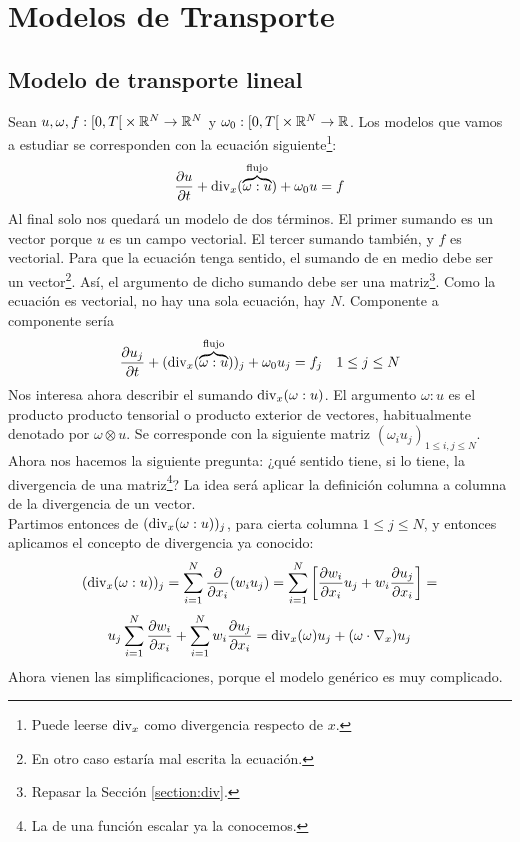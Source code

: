 \chapter{Modelos de Transporte}
\noindent

\section{Modelo de transporte lineal}

Sean $u,\omega,f : \left[0,T \right[ \times \mathbb{R}^N \to \mathbb{R}^N$ y $\omega_0: \left[0,T \right[ \times \mathbb{R}^N \to \mathbb{R}$. Los modelos que vamos a estudiar
se corresponden con la ecuación siguiente\footnote{Puede leerse $\text{div}_x$ como divergencia respecto de $x$.}:
\begin{equation}\label{eq:ec10}
    \dfrac{\partial u}{\partial t} + \text{div}_x(\overbrace{\omega:u}^{\text{flujo}}) + \omega_0 u = f
\end{equation}
Al final solo nos quedará un modelo de dos términos. El primer sumando es un vector porque $u$ es un campo vectorial. El tercer sumando también,
y $f$ es vectorial. Para que la ecuación tenga sentido, el sumando de en medio debe ser un vector\footnote{En otro caso estaría mal escrita la ecuación.}. 
Así, el argumento de dicho sumando debe ser una matriz\footnote{Repasar la Sección \ref{section:div}.}. Como la ecuación es vectorial, no hay una sola ecuación, hay $N$.
Componente a componente sería
$$\dfrac{\partial u_j}{\partial t} + (\text{div}_x(\overbrace{\omega:u}^{\text{flujo}}))_j + \omega_0 u_j = f_j \quad 1 \leq j \leq N$$
Nos interesa ahora describir el sumando $\text{div}_x(\omega:u)$. El argumento $\omega:u$ es el producto producto tensorial o producto exterior de vectores, habitualmente denotado por 
$\omega\otimes u$. Se corresponde con la siguiente matriz $(\omega_iu_j)_{1 \leq i,j \leq N}$. Ahora nos hacemos la siguiente pregunta: ¿qué sentido tiene, si lo tiene, la divergencia de una matriz\footnote{La de una función
escalar ya la conocemos.}? La idea será aplicar la definición columna a columna de la divergencia de un vector. \\

Partimos entonces de $(\text{div}_x(\omega : u))_j$, para cierta columna $1 \leq j \leq N$, y entonces aplicamos el concepto de divergencia ya conocido:
$$(\text{div}_x(\omega : u))_j = \sum_{i=1}^{N} \dfrac{\partial}{\partial x_i} (w_i u_j) = \sum_{i=1}^{N} \left[\dfrac{\partial w_i}{\partial x_i} u_j + w_i \dfrac{\partial u_j}{\partial x_i} \right] =$$
$$u_j\sum_{i=1}^{N} \dfrac{\partial w_i}{\partial x_i} + \sum_{i=1}^{N} w_i \dfrac{\partial u_j}{\partial x_i} = \text{div}_x(\omega) u_j + (\omega \cdot \nabla_x) u_j$$
Ahora vienen las simplificaciones, porque el modelo genérico es muy complicado.

